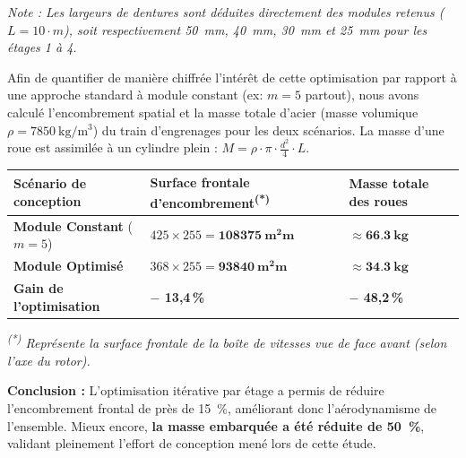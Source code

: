 \documentclass[11pt,a4paper]{article}
\begin{document}
\textit{Note : Les largeurs de dentures sont déduites directement des modules retenus ($L = 10 \cdot m$), soit respectivement \qty{50}{\milli\meter}, \qty{40}{\milli\meter}, \qty{30}{\milli\meter} et \qty{25}{\milli\meter} pour les étages 1 à 4.}

\begin{tcolorbox}[colback=BoxBg, colframe=TealAccent, arc=2pt, boxrule=0.8pt, title=\textbf{Bilan de masse et d'encombrement global}]
Afin de quantifier de manière chiffrée l'intérêt de cette optimisation par rapport à une approche standard à module constant (ex: $m=5$ partout), nous avons calculé l'encombrement spatial et la masse totale d'acier (masse volumique $\rho = \qty{7850}{\kilogram\per\cubic\meter}$) du train d'engrenages pour les deux scénarios. La masse d'une roue est assimilée à un cylindre plein : $M = \rho \cdot \pi \cdot \frac{d^2}{4} \cdot L$.

\begin{center}
\small
\begin{tabularx}{\linewidth}{>{\raggedright\arraybackslash}p{3.8cm} X >{\centering\arraybackslash}p{2.6cm}}
    \toprule
    \textbf{Scénario de conception} & \textbf{Surface frontale d'encombrement}\textsuperscript{(*)} & \textbf{Masse totale des roues} \\
    \midrule
    \textbf{Module Constant} ($m=5$) & $425 \times 255 = \mathbf{\qty{108375}{\square\milli\meter}}$ & $\approx \mathbf{\qty{66,3}{\kilogram}}$ \\
    \textbf{Module Optimisé}        & $368 \times 255 = \mathbf{\qty{93840}{\square\milli\meter}}$  & $\approx \mathbf{\qty{34,3}{\kilogram}}$ \\
    \midrule
    \textbf{Gain de l'optimisation}  & \textbf{$-$ 13{,}4\,\%}                                       & \textbf{$-$ 48{,}2\,\%} \\
    \bottomrule
\end{tabularx}
\vspace{1.5mm}
{\raggedright \footnotesize \textit{\textsuperscript{(*)} Représente la surface frontale de la boîte de vitesses vue de face avant (selon l'axe du rotor).}\par}
\end{center}

\textbf{Conclusion :} L'optimisation itérative par étage a permis de réduire l'encombrement frontal de près de \qty{15}{\percent}, améliorant donc l'aérodynamisme de l'ensemble. Mieux encore, \textbf{la masse embarquée a été réduite de \qty{50}{\percent}}, validant pleinement l'effort de conception mené lors de cette étude.
\end{tcolorbox}
\end{document}
